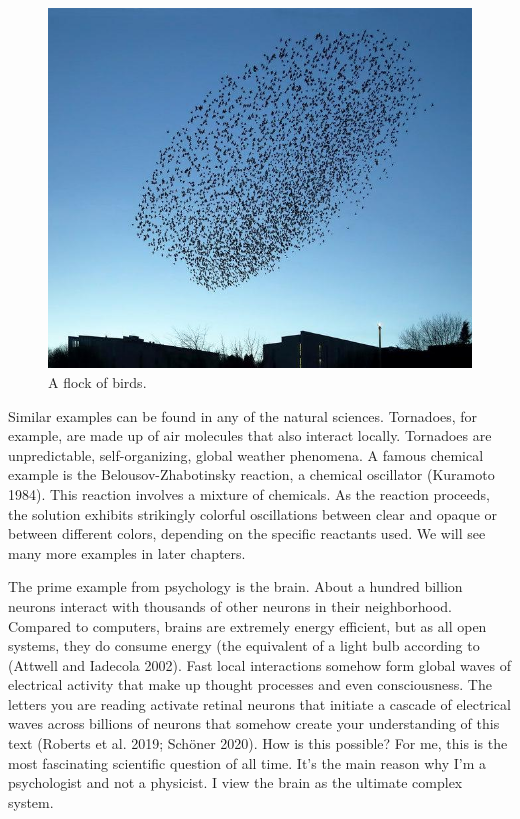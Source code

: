 \documentclass[
  a4paper,
  DIV=11,
  numbers=noendperiod,
  oneside]{scrreprt}
\begin{document}
\begin{figure}

{\centering \includegraphics{media/ch1/image1.jpg}

}

\caption{\label{fig-ch1-img1}A flock of birds.}

\end{figure}

Similar examples can be found in any of the natural sciences. Tornadoes,
for example, are made up of air molecules that also interact locally.
Tornadoes are unpredictable, self-organizing, global weather phenomena.
A famous chemical example is the Belousov-Zhabotinsky reaction, a
chemical oscillator (Kuramoto 1984). This reaction involves a mixture of
chemicals. As the reaction proceeds, the solution exhibits strikingly
colorful oscillations between clear and opaque or between different
colors, depending on the specific reactants used. We will see many more
examples in later chapters.

The prime example from psychology is the brain. About a hundred billion
neurons interact with thousands of other neurons in their neighborhood.
Compared to computers, brains are extremely energy efficient, but as all
open systems, they do consume energy (the equivalent of a light bulb
according to (Attwell and Iadecola 2002). Fast local interactions
somehow form global waves of electrical activity that make up thought
processes and even consciousness. The letters you are reading activate
retinal neurons that initiate a cascade of electrical waves across
billions of neurons that somehow create your understanding of this text
(Roberts et al. 2019; Schöner 2020). How is this possible? For me, this
is the most fascinating scientific question of all time. It's the main
reason why I'm a psychologist and not a physicist. I view the brain as
the ultimate complex system.
\end{document}

